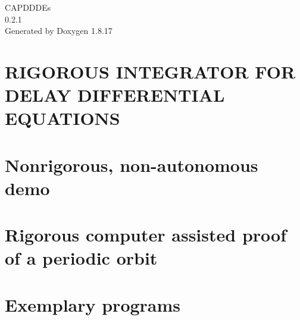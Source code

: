 \let\mypdfximage\pdfximage\def\pdfximage{\immediate\mypdfximage}\documentclass[twoside]{book}
\newcommand{\+}{\discretionary{\mbox{\scriptsize$\hookleftarrow$}}{}{}}
\newcommand{\clearemptydoublepage}{%
  \newpage{\pagestyle{empty}\cleardoublepage}%
}
\begin{document}
\hypersetup{pageanchor=false,
             bookmarksnumbered=true,
             pdfencoding=unicode
            }
\begin{titlepage}
\vspace*{7cm}
\begin{center}%
{\Large C\+A\+P\+D\+D\+D\+Es \\[1ex]\large 0.\+2.\+1 }\\
\vspace*{1cm}
{\large Generated by Doxygen 1.8.17}\\
\end{center}
\end{titlepage}
\clearemptydoublepage
{}
\tableofcontents
\clearemptydoublepage
{}
\hypersetup{pageanchor=true}

\chapter{R\+I\+G\+O\+R\+O\+US I\+N\+T\+E\+G\+R\+A\+T\+OR F\+OR D\+E\+L\+AY D\+I\+F\+F\+E\+R\+E\+N\+T\+I\+AL E\+Q\+U\+A\+T\+I\+O\+NS}
\label{index}\hypertarget{index}{}
\chapter{Nonrigorous, non-\/autonomous demo}
\label{md__home_robson_ROBERT-PRACA-CHMURA_eclipse-workspace_capdDDEs5_81_82_programs_examples_demo-elninio_README}

\chapter{Rigorous computer assisted proof of a periodic orbit}
\label{md__home_robson_ROBERT-PRACA-CHMURA_eclipse-workspace_capdDDEs5_81_82_programs_examples_mackey-glass-stable-periodic_README}

\chapter{Exemplary programs}
\label{md__home_robson_ROBERT-PRACA-CHMURA_eclipse-workspace_capdDDEs5_81_82_programs_examples_README}

\end{document}
